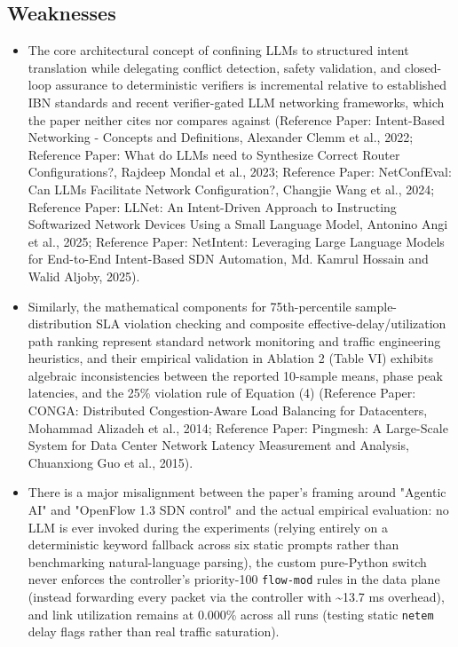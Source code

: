 \documentclass[11pt,a4paper]{article}
\begin{document}
\subsection*{Weaknesses}
\begin{itemize}[leftmargin=1.8em,itemsep=2pt]
\item The core architectural concept of confining LLMs to structured intent translation while delegating conflict detection, safety validation, and closed-loop assurance to deterministic verifiers is incremental relative to established IBN standards and recent verifier-gated LLM networking frameworks, which the paper neither cites nor compares against (Reference Paper: Intent-Based Networking - Concepts and Definitions, Alexander Clemm et al., 2022; Reference Paper: What do LLMs need to Synthesize Correct Router Configurations?, Rajdeep Mondal et al., 2023; Reference Paper: NetConfEval: Can LLMs Facilitate Network Configuration?, Changjie Wang et al., 2024; Reference Paper: LLNet: An Intent-Driven Approach to Instructing Softwarized Network Devices Using a Small Language Model, Antonino Angi et al., 2025; Reference Paper: NetIntent: Leveraging Large Language Models for End-to-End Intent-Based SDN Automation, Md. Kamrul Hossain and Walid Aljoby, 2025).
\item Similarly, the mathematical components for 75th-percentile sample-distribution SLA violation checking and composite effective-delay/utilization path ranking represent standard network monitoring and traffic engineering heuristics, and their empirical validation in Ablation 2 (Table VI) exhibits algebraic inconsistencies between the reported 10-sample means, phase peak latencies, and the 25\% violation rule of Equation (4) (Reference Paper: CONGA: Distributed Congestion-Aware Load Balancing for Datacenters, Mohammad Alizadeh et al., 2014; Reference Paper: Pingmesh: A Large-Scale System for Data Center Network Latency Measurement and Analysis, Chuanxiong Guo et al., 2015).
\item There is a major misalignment between the paper's framing around "Agentic AI" and "OpenFlow 1.3 SDN control" and the actual empirical evaluation: no LLM is ever invoked during the experiments (relying entirely on a deterministic keyword fallback across six static prompts rather than benchmarking natural-language parsing), the custom pure-Python switch never enforces the controller's priority-100 \texttt{flow-mod} rules in the data plane (instead forwarding every packet via the controller with \textasciitilde{}13.7 ms overhead), and link utilization remains at 0.000\% across all runs (testing static \texttt{netem} delay flags rather than real traffic saturation).

\end{itemize}
\end{document}
